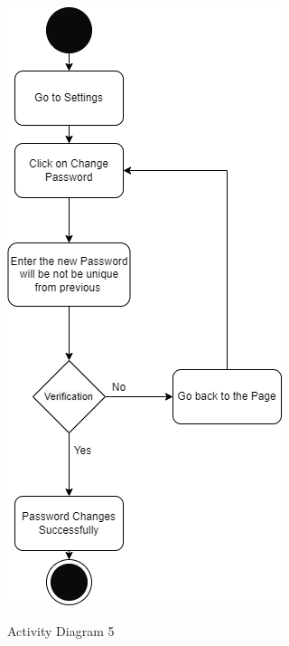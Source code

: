 \begin{figure}[H]
    \centering
    \caption{Activity Diagram 5}
    \includegraphics[scale=0.5]{./diagrams/Activity Diagram/ad-05.png}
    \label{fig:act-05}

\end{figure}


